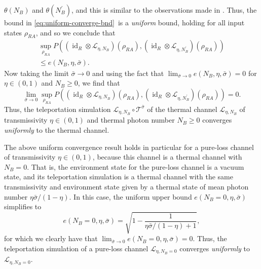 \documentclass[apsrev,twocolumn]{revtex4-1}%
\begin{document}
$\theta(N_{B})$ and $\theta(N_{B}^{\prime})$, and this is similar to the
observations made in \cite{TW16,SWAT17}. Thus, the bound in
\eqref{eq:uniform-converge-bnd}\ is a \textit{uniform} bound, holding for all
input states $\rho_{RA}$, and so we conclude that%
\begin{multline}
\sup_{\rho_{RA}}P((\operatorname{id}_{R}\otimes\mathcal{L}_{\eta,N_{B}}%
)(\rho_{RA}),(\operatorname{id}_{R}\otimes\mathcal{L}_{\eta,N_{B}^{\prime}%
})(\rho_{RA}))\\
\leq e(N_{B},\eta,\bar{\sigma}). \label{eq:loss-unif-bnd}%
\end{multline}
Now taking the limit $\bar{\sigma}\rightarrow0$ and using the fact that
$\lim_{\bar{\sigma}\rightarrow0}e(N_{B},\eta,\bar{\sigma})=0$ for $\eta
\in(0,1)$ and $N_{B}\geq0$, we find that%
\begin{equation}
\lim_{\bar{\sigma}\rightarrow0}\sup_{\rho_{RA}}P((\operatorname{id}_{R}%
\otimes\mathcal{L}_{\eta,N_{B}})(\rho_{RA}),(\operatorname{id}_{R}%
\otimes\mathcal{L}_{\eta,N_{B}^{\prime}})(\rho_{RA}))=0.
\end{equation}
Thus, the teleportation simulation $\mathcal{L}_{\eta,N_{B}}\circ
\mathcal{T}^{\bar{\sigma}}$ of the thermal channel $\mathcal{L}_{\eta,N_{B}}$
of transmissivity $\eta\in(0,1)$ and thermal photon number $N_{B}\geq0$
converges \textit{uniformly} to the thermal channel.

The above uniform convergence result holds in particular for a pure-loss
channel of transmissivity $\eta\in(0,1)$, because this channel is a thermal
channel with $N_{B}=0$. That is, the environment state for the pure-loss
channel is a vacuum state, and its teleportation simulation is a thermal
channel with the same transmissivity and environment state given by a thermal
state of mean photon number $\eta\bar{\sigma}/(1-\eta)$. In this case, the
uniform upper bound $e(N_{B}=0,\eta,\bar{\sigma})$ simplifies to%
\begin{equation}
e(N_{B}=0,\eta,\bar{\sigma})=\sqrt{1-\frac{1}{\eta\bar{\sigma}/(1-\eta)+1}},
\end{equation}
for which we clearly have that $\lim_{\bar{\sigma}\rightarrow0}e(N_{B}%
=0,\eta,\bar{\sigma})=0$. Thus, the teleportation simulation of a pure-loss
channel $\mathcal{L}_{\eta,N_{B}=0}$ converges \textit{uniformly} to
$\mathcal{L}_{\eta,N_{B}=0}$.
\end{document}
